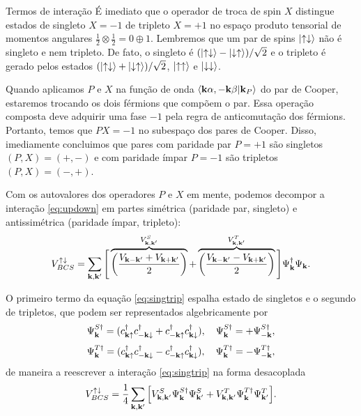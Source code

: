 \documentclass[a4paper,10pt]{article}
\begin{document}
\begin{section}{Termos de interação}
É imediato que o operador de troca de spin $X$ distingue estados de singleto $X = -1$ de tripleto $X = +1$ no espaço produto tensorial de momentos angulares $\frac{1}{2} \otimes \frac{1}{2} = 0 \oplus 1$. Lembremos que um par de spins $\ket{\uparrow\downarrow}$ não é singleto e nem tripleto. De fato, o singleto é $(\ket{\uparrow\downarrow} - \ket{\downarrow\uparrow})/\sqrt{2}$ e o tripleto é gerado pelos estados $(\ket{\uparrow\downarrow} + \ket{\downarrow\uparrow})/\sqrt{2}$, $\ket{\uparrow\uparrow}$ e $\ket{\downarrow\downarrow}$.

\n

Quando aplicamos $P$ e $X$ na função de onda $\braket{\vb{k}\alpha,-\vb{k}\beta}{\vb{k}_P}$ do par de Cooper, estaremos trocando os dois férmions que compõem o par. Essa operação composta deve adquirir uma fase $-1$ pela regra de anticomutação dos férmions. Portanto, temos que $PX = -1$ no subespaço dos pares de Cooper. Disso, imediamente concluimos que pares com paridade par $P = +1$ são singletos $(P,X) = (+, -)$ e com paridade ímpar $P = -1$ são tripletos $(P,X) = (-,+)$.

\n

Com os autovalores dos operadores $P$ e $X$ em mente, podemos decompor a interação \ref{eq:updown} em partes simétrica (paridade par, singleto) e antissimétrica (paridade ímpar, tripleto):
\begin{equation} \label{eq:singtrip}
V_{BCS}^{\uparrow\downarrow} = \sum_{\vb{k},\vb{k}'}
\Bigg[
\overbrace{\qty(\frac{V_{\vb{k}-\vb{k}'} + V_{\vb{k}+\vb{k}'}}{2})}^{V_{\vb{k},\vb{k}'}^S} +
\overbrace{\qty(\frac{V_{\vb{k}-\vb{k}'} - V_{\vb{k}+\vb{k}'}}{2})}^{V_{\vb{k},\vb{k}'}^T}
\Bigg] \Psi_{\vb{k}}^\dagger \Psi_{\vb{k}}.
\end{equation}

O primeiro termo da equação \ref{eq:singtrip} espalha estado de singletos e o segundo de tripletos, que podem ser representados algebricamente por
$$
\Psi_{\vb{k}}^{S\dagger} = (c_{\vb{k}\uparrow}^\dagger c_{-\vb{k}\downarrow}^\dagger + c_{-\vb{k}\uparrow}^\dagger c_{\vb{k}\downarrow}^\dagger),
\quad \Psi_{\vb{k}}^{S\dagger} = +\Psi_{-\vb{k}}^{S\dagger},
$$
$$
\Psi_{\vb{k}}^{T\dagger} = (c_{\vb{k}\uparrow}^\dagger c_{-\vb{k}\downarrow}^\dagger - c_{-\vb{k}\uparrow}^\dagger c_{\vb{k}\downarrow}^\dagger),
\quad \Psi_{\vb{k}}^{T\dagger} = -\Psi_{-\vb{k}}^{T\dagger},
$$
de maneira a reescrever a interação \ref{eq:singtrip} na forma desacoplada
$$
V_{BCS}^{\uparrow\downarrow} =
\frac{1}{4} \sum_{\vb{k},\vb{k}'}
\qty[
V_{\vb{k},\vb{k}'}^S \Psi_{\vb{k}}^{S\dagger} \Psi_{\vb{k}'}^{S} +
V_{\vb{k},\vb{k}'}^T \Psi_{\vb{k}}^{T\dagger} \Psi_{\vb{k}'}^{T}
].
$$



\end{section}
\end{document}
